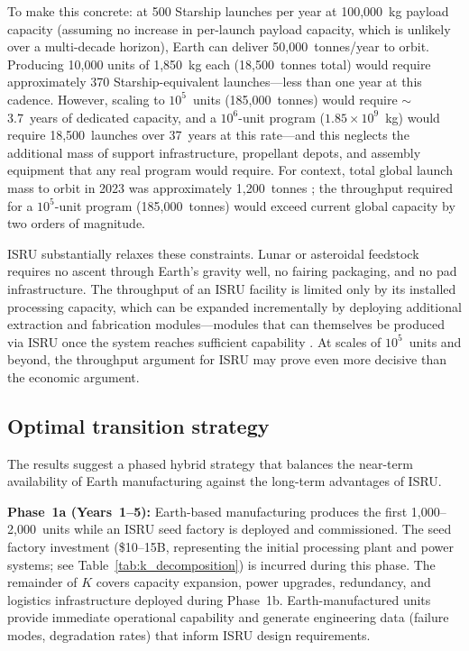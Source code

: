 \documentclass[preprint,12pt]{elsarticle}
\begin{document}
To make this concrete: at 500 Starship launches per year at 100{,}000~kg payload capacity (assuming no increase in per-launch payload capacity, which is unlikely over a multi-decade horizon), Earth can deliver 50{,}000~tonnes/year to orbit. Producing 10{,}000 units of 1{,}850~kg each (18{,}500~tonnes total) would require approximately 370 Starship-equivalent launches---less than one year at this cadence. However, scaling to $10^5$~units (185{,}000~tonnes) would require $\sim$3.7~years of dedicated capacity, and a $10^6$-unit program ($1.85 \times 10^9$~kg) would require 18{,}500~launches over 37~years at this rate---and this neglects the additional mass of support infrastructure, propellant depots, and assembly equipment that any real program would require. For context, total global launch mass to orbit in 2023 was approximately 1{,}200~tonnes \cite{jones2022}; the throughput required for a $10^5$-unit program (185{,}000~tonnes) would exceed current global capacity by two orders of magnitude.

ISRU substantially relaxes these constraints. Lunar or asteroidal feedstock requires no ascent through Earth's gravity well, no fairing packaging, and no pad infrastructure. The throughput of an ISRU facility is limited only by its installed processing capacity, which can be expanded incrementally by deploying additional extraction and fabrication modules---modules that can themselves be produced via ISRU once the system reaches sufficient capability \cite{metzger2013}. At scales of $10^5$~units and beyond, the throughput argument for ISRU may prove even more decisive than the economic argument.

\subsection{Optimal transition strategy}

The results suggest a phased hybrid strategy that balances the near-term availability of Earth manufacturing against the long-term advantages of ISRU.

\textbf{Phase~1a (Years~1--5):} Earth-based manufacturing produces the first 1{,}000--2{,}000~units while an ISRU seed factory is deployed and commissioned. The seed factory investment (\$10--15B, representing the initial processing plant and power systems; see Table~\ref{tab:k_decomposition}) is incurred during this phase. The remainder of $K$ covers capacity expansion, power upgrades, redundancy, and logistics infrastructure deployed during Phase~1b. Earth-manufactured units provide immediate operational capability and generate engineering data (failure modes, degradation rates) that inform ISRU design requirements.
\end{document}
